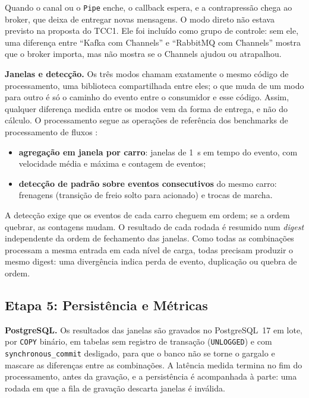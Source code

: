 \documentclass[12pt]{article}
\begin{document}
Quando o canal ou o \texttt{Pipe} enche, o callback espera, e a contrapressão
chega ao broker, que deixa de entregar novas mensagens. O modo direto não estava
previsto na proposta do TCC1. Ele foi incluído como grupo de controle: sem ele,
uma diferença entre ``Kafka com Channels'' e ``RabbitMQ com Channels'' mostra que
o broker importa, mas não mostra se o Channels ajudou ou atrapalhou.

\textbf{Janelas e detecção.} Os três modos chamam exatamente o mesmo código de
processamento, uma biblioteca compartilhada entre eles; o que muda de um modo para
outro é só o caminho do evento entre o consumidor e esse código. Assim, qualquer
diferença medida entre os modos vem da forma de entrega, e não do cálculo. O
processamento segue as operações de referência dos benchmarks de processamento de
fluxos \cite{arasu:2004,mutschler:2013}:

\begin{itemize}
  \item \textbf{agregação em janela por carro}: janelas de 1~s em tempo do evento,
        com velocidade média e máxima e contagem de eventos;
  \item \textbf{detecção de padrão sobre eventos consecutivos} do mesmo carro:
        frenagens (transição de freio solto para acionado) e trocas de marcha.
\end{itemize}

A detecção exige que os eventos de cada carro cheguem em ordem; se a ordem
quebrar, as contagens mudam. O resultado de cada rodada é resumido num
\textit{digest} independente da ordem de fechamento das janelas. Como todas as
combinações processam a mesma entrada em cada nível de carga, todas precisam
produzir o mesmo digest: uma divergência indica perda de evento, duplicação ou
quebra de ordem.

\subsection{Etapa 5: Persistência e Métricas}
\label{sec:coleta}

\textbf{PostgreSQL.} Os resultados das janelas são gravados no PostgreSQL~17 em
lote, por \texttt{COPY} binário, em tabelas sem registro de transação
(\texttt{UNLOGGED}) e com \texttt{synchronous\_commit} desligado, para que o banco
não se torne o gargalo e mascare as diferenças entre as combinações. A latência
medida termina no fim do processamento, antes da gravação, e a persistência é
acompanhada à parte: uma rodada em que a fila de gravação descarta janelas é
inválida.
\end{document}
